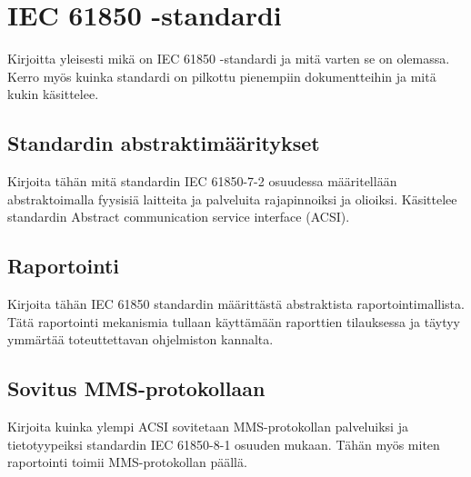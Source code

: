 \chapter{IEC 61850 -standardi}
\label{ch:iec 61850 -standardi}
Kirjoitta yleisesti mikä on IEC 61850 -standardi ja mitä varten se on olemassa. Kerro myös kuinka standardi on pilkottu pienempiin dokumentteihin ja mitä kukin käsittelee.

\section{Standardin abstraktimääritykset}
Kirjoita tähän mitä standardin IEC 61850-7-2 osuudessa määritellään abstraktoimalla fyysisiä laitteita ja palveluita rajapinnoiksi ja olioiksi. Käsittelee standardin Abstract communication service interface (ACSI).

\section{Raportointi}
Kirjoita tähän IEC 61850 standardin määrittästä abstraktista raportointimallista. Tätä raportointi mekanismia tullaan käyttämään raporttien tilauksessa ja täytyy ymmärtää toteuttettavan ohjelmiston kannalta.

\section{Sovitus MMS-protokollaan}
Kirjoita kuinka ylempi ACSI sovitetaan MMS-protokollan palveluiksi ja tietotyypeiksi standardin IEC 61850-8-1 osuuden mukaan. Tähän myös miten raportointi toimii MMS-protokollan päällä.